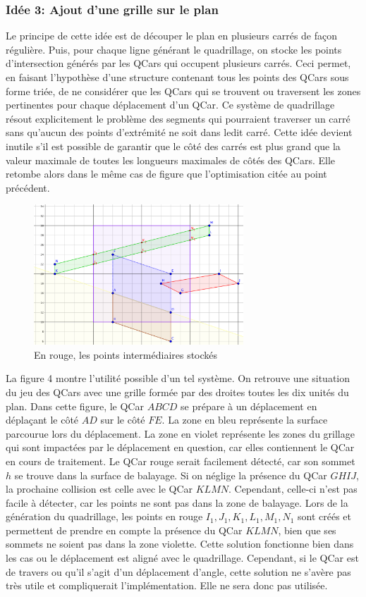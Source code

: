 \documentclass[a4paper, 12pt]{article}
\begin{document}
\subsubsection{Idée 3: Ajout d'une grille sur le plan}
Le principe de cette idée est de découper le plan en plusieurs carrés de façon régulière. Puis, pour chaque ligne générant le quadrillage, on stocke les points d'intersection générés par les QCars qui occupent plusieurs carrés. Ceci permet, en faisant l'hypothèse d'une structure contenant tous les points des QCars sous forme triée, de ne considérer que les QCars qui se trouvent ou traversent les zones pertinentes pour chaque déplacement d'un QCar. Ce système de quadrillage résout explicitement le problème des segments qui pourraient traverser un carré sans qu'aucun des points d'extrémité ne soit dans ledit carré. Cette idée devient inutile s'il est possible de garantir que le côté des carrés est plus grand que la valeur maximale de toutes les longueurs maximales de côtés des QCars. Elle retombe alors dans le même cas de figure que l'optimisation citée au point précédent.
\begin{figure}[H]
 \centering
 \includegraphics[width=0.7\textwidth]{includes/images/physique_conception_04}
 \caption{\label{fig:physique_conception_04}En rouge, les points intermédiaires stockés}
\end{figure}
La figure 4 montre l'utilité possible d'un tel système. On retrouve une situation du jeu des QCars avec une grille formée par des droites toutes les dix unités du plan. Dans cette figure, le QCar $ABCD$ se prépare à un déplacement en déplaçant le côté $AD$ sur le côté $FE$. La zone en bleu représente la surface parcourue lors du déplacement. La zone en violet représente les zones du grillage qui sont impactées par le déplacement en question, car elles contiennent le QCar en cours de traitement. Le QCar rouge serait facilement détecté, car son sommet $h$ se trouve dans la surface de balayage. Si on néglige la présence du QCar $GHIJ$, la prochaine collision est celle avec le QCar $KLMN$. Cependant, celle-ci n'est pas facile à détecter, car les points ne sont pas dans la zone de balayage. Lors de la génération du quadrillage, les points en rouge $I_1, J_1, K_1, L_1, M_1, N_1$ sont créés et permettent de prendre en compte la présence du QCar $KLMN$, bien que ses sommets ne soient pas dans la zone violette. Cette solution fonctionne bien dans les cas ou le déplacement est aligné avec le quadrillage. Cependant, si le QCar est de travers ou qu'il s'agit d'un déplacement d'angle, cette solution ne s'avère pas très utile et compliquerait l'implémentation. Elle ne sera donc pas utilisée.
\end{document}
